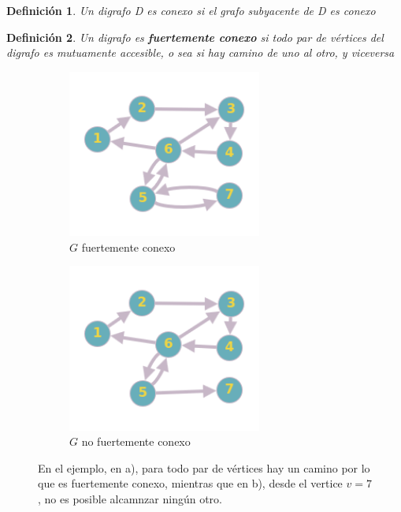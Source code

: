 \documentclass[a4paper,1pt]{report}
\newtheorem*{dfn}{Definición}
\begin{document}
\begin{dfn}
 Un digrafo D es conexo si el grafo subyacente de D es conexo
\end{dfn}

\begin{dfn}
 Un digrafo es \textbf{fuertemente conexo} si todo par de vértices del digrafo es mutuamente accesible, o sea si hay camino de uno al otro, y viceversa
\end{dfn}

\begin{figure}[H]
    \centering
    \begin{subfigure}[b]{0.45\textwidth}
        \centering
        \includegraphics[width=0.7\textwidth]{figures8/digrafo.png}
        \caption{$G$ fuertemente conexo}
    \end{subfigure} 
        \begin{subfigure}[b]{0.45\textwidth}
        \centering
        \includegraphics[width=0.7\textwidth]{figures8/NoFConex.png}
        \caption{$G$ no fuertemente conexo}
         \end{subfigure} 

        \caption{En el ejemplo, en a), para todo par de v\'ertices hay un camino por lo que es fuertemente conexo, mientras que en b), desde el vertice $v =7$, no es posible alcamnzar ning\'un otro.}
\end{figure} 
\end{document}
